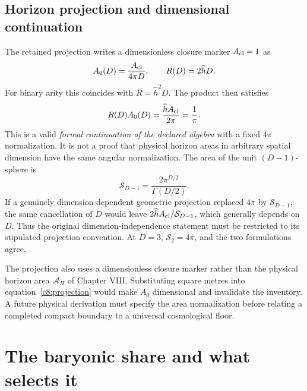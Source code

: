\subsection{Horizon projection and dimensional continuation}
The retained projection writes a dimensionless closure marker $A_{\rm cl}=1$ as
\begin{equation}
 A_0(D)=\frac{A_{\rm cl}}{4\pi D},\qquad
 R(D)=2\widehat hD.
 \label{c8:projection}
\end{equation}
For binary arity this coincides with $R=\widehat h^2D$. The product then satisfies
\begin{equation}
 R(D)A_0(D)=\frac{\widehat hA_{\rm cl}}{2\pi}
 =\frac1\pi.
 \label{c8:formalD}
\end{equation}
This is a valid \emph{formal continuation of the declared algebra} with a fixed $4\pi$ normalization. It is not a proof that physical horizon areas in arbitrary spatial dimension have the same angular normalization. The area of the unit $(D-1)$-sphere is
\begin{equation}
 \mathcal S_{D-1}=\frac{2\pi^{D/2}}{\Gamma(D/2)}.
 \label{c8:solidangle}
\end{equation}
If a genuinely dimension-dependent geometric projection replaced $4\pi$ by $\mathcal S_{D-1}$, the same cancellation of $D$ would leave $2\widehat hA_{\rm cl}/\mathcal S_{D-1}$, which generally depends on $D$. Thus the original dimension-independence statement must be restricted to its stipulated projection convention. At $D=3$, $\mathcal S_2=4\pi$, and the two formulations agree.

The projection also uses a dimensionless closure marker rather than the physical horizon area $\mathcal A_H$ of Chapter VIII. Substituting square metres into equation~\eqref{c8:projection} would make $A_0$ dimensional and invalidate the inventory. A future physical derivation must specify the area normalization before relating a completed compact boundary to a universal cosmological floor.

\section{The baryonic share and what selects it}
